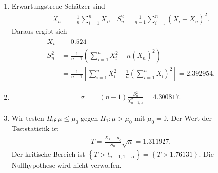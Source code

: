 \solution
\begin{enumerate}
    \item Erwartungstreue Schätzer sind
        \begin{align*}
            \bar X_n &= \frac{1}{n} \sum_{i=1}^{n} X_i, & S^2_n = \frac{1}{n-1} \sum_{i=1}^{n} \left( X_i - \bar X_n \right)^2.
        \end{align*}
        Daraus ergibt sich
        \begin{align*}
            \bar X_n &= 0.524  \\
            S^2_n &= \frac{1}{n-1} \left( \sum_{i=1}^{n} X_i^2 - n \left( \bar X_n \right)^2 \right) \\
            &= \frac{1}{n-1} \left[  \sum_{i=1}^{n} X_i^{2 } - \frac{1}{n} \left( \sum_{i=1}^{n} X_i \right)^2 \right] = 2.392954. 
        \end{align*}
    \item
        \begin{align*}
            \bar \sigma &= (n-1) \frac{S^2_n}{\chi^{2}_{n-1, \alpha}} = 4.300817. 
        \end{align*}
    \item Wir testen $H_0: \mu \leq \mu_0$ gegen $H_1: \mu>\mu_0$ mit
        $\mu_0=0$. Der Wert der Teststatistik ist
        \begin{align*}
            T = \frac{\bar X_n - \mu_0}{S_n} \sqrt{n} = 1.311927. 
        \end{align*}
        Der kritische Bereich ist $\left\{ T > t_{n-1, 1-\alpha}\right\}=
        \left\{ T > 1.76131 \right\}$. Die Nullhypothese wird nicht verworfen.
\end{enumerate}

